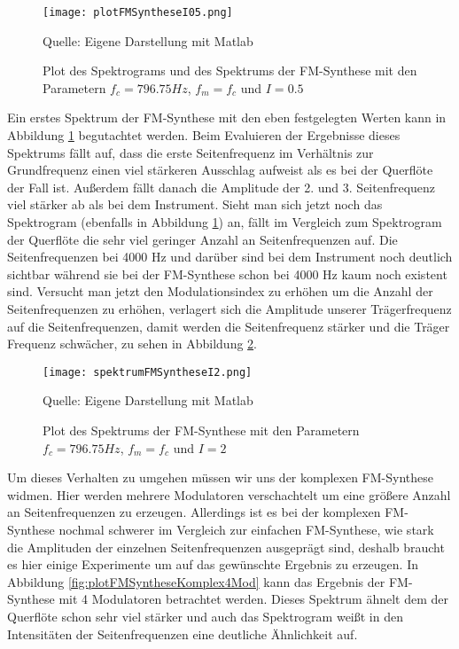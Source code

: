 \begin{figure} [ht]
\centering
  \texttt{[image: plotFMSyntheseI05.png]}
\caption{Plot des Spektrograms und des Spektrums der FM-Synthese mit den Parametern $f_c = 796.75 Hz$, $f_m = f_c$ und $I = 0.5$ }
\label{fig:plotFMSyntheseI05}
Quelle: Eigene Darstellung mit Matlab
\end{figure}

Ein erstes Spektrum der FM-Synthese mit den eben festgelegten Werten kann in Abbildung \ref{fig:plotFMSyntheseI05} begutachtet werden. Beim Evaluieren der Ergebnisse dieses Spektrums fällt auf, dass die erste Seitenfrequenz im Verhältnis zur Grundfrequenz einen viel stärkeren Ausschlag aufweist als es bei der Querflöte der Fall ist. Außerdem fällt danach die Amplitude der 2. und 3. Seitenfrequenz viel stärker ab als bei dem Instrument. Sieht man sich jetzt noch das Spektrogram (ebenfalls in Abbildung \ref{fig:plotFMSyntheseI05}) an, fällt im Vergleich zum Spektrogram der Querflöte die sehr viel geringer Anzahl an Seitenfrequenzen auf. Die Seitenfrequenzen bei 4000 Hz und darüber sind bei dem Instrument noch deutlich sichtbar während sie bei der FM-Synthese schon bei 4000 Hz kaum noch existent sind. Versucht man jetzt den Modulationsindex zu erhöhen um die Anzahl der Seitenfrequenzen zu erhöhen, verlagert sich die Amplitude unserer Trägerfrequenz auf die Seitenfrequenzen, damit werden die Seitenfrequenz stärker und die Träger Frequenz schwächer, zu sehen in Abbildung \ref{fig:spektrumFMSyntheseI2}. 

\begin{figure} [ht]
\centering
  \texttt{[image: spektrumFMSyntheseI2.png]}
\caption{Plot des Spektrums der FM-Synthese mit den Parametern $f_c = 796.75 Hz$, $f_m = f_c$ und $I = 2$}
\label{fig:spektrumFMSyntheseI2}
Quelle: Eigene Darstellung mit Matlab
\end{figure}

Um dieses Verhalten zu umgehen müssen wir uns der komplexen FM-Synthese widmen. Hier werden mehrere Modulatoren verschachtelt um eine größere Anzahl an Seitenfrequenzen zu erzeugen. Allerdings ist es bei der komplexen FM-Synthese nochmal schwerer im Vergleich zur einfachen FM-Synthese, wie stark die Amplituden der einzelnen Seitenfrequenzen ausgeprägt sind, deshalb braucht es hier einige Experimente um auf das gewünschte Ergebnis zu erzeugen. In Abbildung \ref{fig:plotFMSyntheseKomplex4Mod} kann das Ergebnis der FM-Synthese mit 4 Modulatoren betrachtet werden. Dieses Spektrum ähnelt dem der Querflöte schon sehr viel stärker und auch das Spektrogram weißt in den Intensitäten der Seitenfrequenzen eine deutliche Ähnlichkeit auf.

